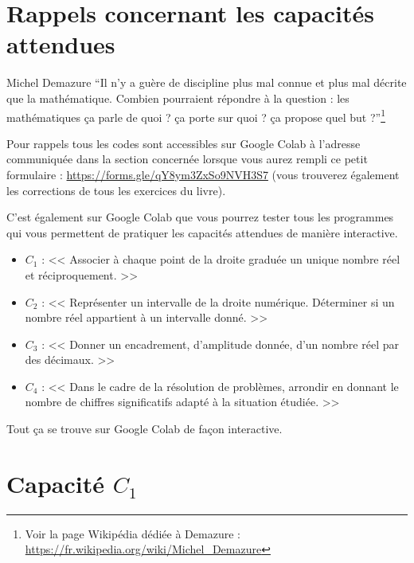 \documentclass[a4paper,11pt]{book}
\begin{document}
\clearpage

\chapter{Rappels concernant les capacités attendues}
\label{sec:orgd0be93f}
\label{org09fb152}
\label{page:sec3review}

\begin{myquote}{Michel Demazure}
\enquote{Il n’y a guère de discipline plus mal connue et plus mal décrite
que la mathématique. Combien pourraient répondre à la question :
les mathématiques ça parle de quoi ? ça porte sur quoi ? ça propose
quel but ?}\footnote{Voir la page Wikipédia dédiée à Demazure : \url{https://fr.wikipedia.org/wiki/Michel_Demazure}}
\end{myquote}


\clearpage

Pour rappels tous les codes sont accessibles sur Google Colab à
l'adresse communiquée dans la section concernée lorsque vous
aurez rempli ce petit formulaire : \url{https://forms.gle/qY8ym3ZxSo9NVH3S7}
(vous trouverez également les corrections de tous les exercices du
livre).

C'est également sur Google Colab que vous pourrez tester tous les
programmes qui vous permettent de pratiquer les capacités attendues
de manière interactive.


\begin{itemize}
\item \(C_1\) : << Associer à chaque point de la droite graduée un unique
nombre réel et réciproquement. >>
\item \(C_2\) : << Représenter un intervalle de la droite
numérique. Déterminer si un nombre réel appartient à un intervalle
donné. >>
\item \(C_3\) : << Donner un encadrement, d'amplitude
donnée, d'un nombre réel par des
décimaux. >>
\item \(C_4\) : << Dans le cadre de la résolution de problèmes, arrondir
en donnant le nombre de chiffres significatifs adapté à la situation
étudiée. >>
\end{itemize}


Tout ça se trouve sur Google Colab de façon interactive.

\clearpage

\chapter{Capacité \(C_1\)}
\label{sec:orgd137f12}
\label{org8554f1b}
\label{page:sec3.2capacity1}
\end{document}
